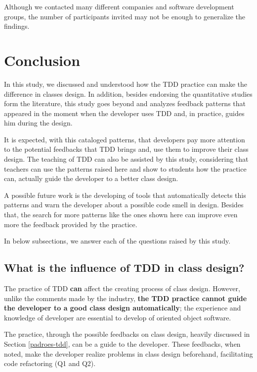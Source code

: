 \documentclass[times]{speauth}
\begin{document}
Although we contacted many different companies and software development groups,
the number of participants invited may not be enough to generalize the findings.

\section{Conclusion}


In this study, we discussed and understood how the TDD practice can make the
difference in classes design.
In addition, besides endorsing the quantitative studies form the literature, this study
goes beyond and analyzes feedback patterns that appeared in the moment when
the developer uses TDD and, in practice, guides him during the design.

It is expected, with this cataloged patterns, that developers pay more attention
to the potential feedbacks that TDD brings and, use them to improve their class
design. The teaching of TDD can also be assisted by this study, considering
that teachers can use the patterns raised here and show to students
how the practice can, actually guide the developer to a better class design.


A possible future work is the developing of tools that automatically detects this patterns
and warn the developer about a possible code smell in design. Besides that,
the search for more patterns like the ones shown here can improve even more the feedback
provided by the practice.

In below subsections, we answer each of the questions raised by this study.

\subsection{What is the influence of TDD in class design?}

The practice of TDD \textbf{can} affect the creating process of class design. However,
unlike the comments made by the industry, \textbf{the TDD practice cannot guide the
developer to a good class design automatically}; the experience and knowledge of
developer are essential to develop of oriented object software.

The practice, through the possible feedbacks on class design, heavily
discussed in Section \ref{padroes-tdd}, can be a guide to the developer.
These feedbacks, when noted, make the developer realize problems in class
design beforehand, facilitating code refactoring (Q1 and Q2).
\end{document}
